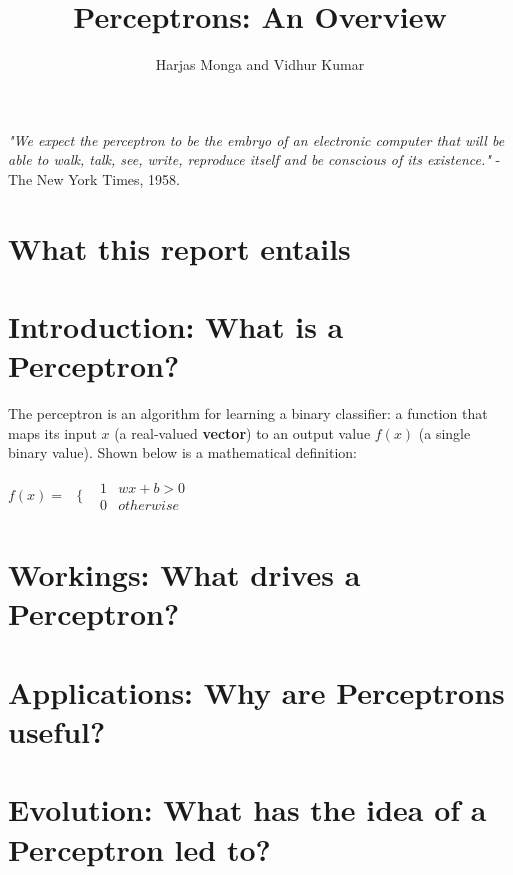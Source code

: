 \documentclass[12pt, titlepage, a4paper]{article}
\title{Perceptrons: An Overview}
\author{Harjas Monga and Vidhur Kumar}
\begin{document}
	\maketitle

	\textit{"We expect the perceptron to be the embryo of an electronic computer that will be able to walk, talk, see, write, reproduce itself and be conscious of its existence."} - The New York Times, 1958.	
	
	\section{What this report entails}
			
	
	\section{Introduction: What is a Perceptron?}
	
	The perceptron is an algorithm for learning a binary classifier: a function that maps its input $x$ (a real-valued \textbf{vector}) to an output value $f(x)$ (a single binary value). Shown below is a mathematical definition: \\
	
	\begin{center}
		$f(x) = $
		$
\begin{array}{cc}
  \{ & 
    \begin{array}{cc}
    	1 & wx + b > 0 \\
    	0 & otherwise
    \end{array}
\end{array}
		$
	\end{center}
	
	\section{Workings: What drives a Perceptron?}
		
	\section{Applications: Why are Perceptrons useful?}
	
	
	\section{Evolution: What has the idea of a Perceptron led to?}
\end{document}
